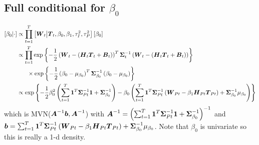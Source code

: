 \documentclass{article}\usepackage[]{graphicx}\usepackage[]{color}
\def\bm#1{\mbox{\boldmath $#1$}}
\begin{document}
\subsection{Full conditional for $\beta_0$}
%
\begin{align*}
%
\left[ \beta_0 \middle| \cdot \right] & \propto \prod_{t = 1}^T \left[ \bm{W}_t \middle| \bm{T}_t, \beta_0, \beta_1, \tau^2_I, \tau^2_P \right] \left[ \beta_0 \right]\\
%
& \propto \prod_{t = 1}^T \exp{ \left\{ - \frac{1} {2} \left( \bm{W}_t - \left( \bm{H}_t \bm{T}_t + \bm{B}_t \right) \right)^T \bm{\Sigma}_t^{ - 1} \left( \bm{W}_t - \left( \bm{H}_t \bm{T}_t + \bm{B}_t \right) \right) \right\} }\\
& \hspace{6mm} \times \exp{ \left\{ - \frac{1} {2} \left( \beta_0 - \mu_{\beta_0} \right)^T \bm{\Sigma}_{\beta_0}^{ - 1} \left( \beta_0 - \mu_{\beta_0} \right) \right\} }\\
%
& \propto \exp{ \left\{ - \frac{1} {2} \beta_0^2 \left( \sum_{t = 1}^T \bm{1}^T \bm{\Sigma}_{Pt}^{ - 1} \bm{1} + \bm{\Sigma}_{\beta_0}^{ - 1} \right) - \beta_0 \left( \sum_{t = 1}^T \bm{1}^T \bm{\Sigma}_{Pt}^{ - 1} \left( \bm{W}_{Pt} - \beta_1 \bm{H}_{Pt} \bm{T}_{Pt} \right) + \bm{\Sigma}_{\beta_0}^{ - 1} \mu_{\beta_0} \right) \right\} }\\
%
\end{align*}
%
which is MVN($\bm{A}^{ - 1}\bm{b}, \bm{A}^{ - 1}$) with $\bm{A}^{ - 1} = \left( \sum_{t = 1}^T \bm{1}^T \bm{\Sigma}_{Pt}^{ - 1} \bm{1} + \bm{\Sigma}_{\beta_0}^{ - 1} \right)^{ - 1}$ and $\bm{b} = \sum_{t = 1}^T \bm{1}^T \bm{\Sigma}_{Pt}^{ - 1} \left( \bm{W}_{Pt} - \beta_1 \bm{H}_{Pt} \bm{T}_{Pt} \right)  + \bm{\Sigma}_{\beta_0}^{ - 1} \mu_{\beta_0}$. Note that $\beta_0$ is univariate so this is really a 1-d density.
%
%
\end{document}
